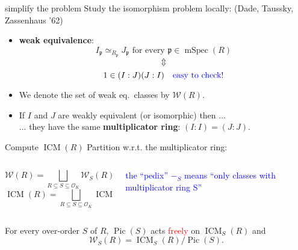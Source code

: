 \documentclass[usenames,dvipsnames,handout]{beamer}
\DeclareMathOperator{\ICM}{ICM}
\DeclareMathOperator{\Pic}{Pic}
\DeclareMathOperator{\mSpec}{mSpec}
\newcommand{\cO}{{\mathcal O}}
\newcommand{\cW}{{\mathcal W}}
\newcommand{\p}{{\mathfrak p}}
\newcommand{\red}[1]{\textcolor{red}{#1}}
\begin{document}
\begin{frame}{ simplify the problem  }
    Study the isomorphism problem locally: (Dade, Taussky, Zassenhaus '62)
    \begin{itemize}
\pause 
    \item  \textbf{weak equivalence}:
    \[I_{\p}\simeq_{R_{\p}} J_{\p} \text{ for every } {\p} \in \mSpec(R)\]
\pause
    \vspace{-6mm}\[\Updownarrow\]
    \[1\in (I:J)(J:I)\quad \textcolor{blue}{\text{easy to check!}}\]
\pause
    \item We denote the set of weak eq.~classes by $\cW(R)$.
\pause 
    \item If $I$ and $J$ are weakly equivalent (or isomorphic) then ...\\
\pause 
    ... they have the same {\bf multiplicator ring}: $(I:I)=(J:J)$.
    \end{itemize}
\end{frame}

\begin{frame}{ Compute $\ICM(R)$ }
\pause 
    Partition w.r.t. the multiplicator ring:
    \begin{columns}
    \begin{column}{0.5\textwidth}
      \[ \cW(R) = \bigsqcup_{R\subseteq S \subseteq \cO_K} \cW_S(R)\]
      \[ \ICM(R) = \bigsqcup_{R\subseteq S \subseteq \cO_K} \ICM_S(R)\]
    \end{column}
\pause
    \begin{column}{0.5\textwidth}  %
    \begin{center}
    \textcolor{blue}{\parbox{10em}{the ``pedix'' $-_S$ means ``only classes with multiplicator ring S''}} 
    \end{center}
    \end{column}
    \end{columns}
\pause \vspace{2em}
    \begin{theorem}[M.]
    For every over-order $S$ of $R$, $\Pic(S)$ acts \red{freely} on $\ICM_S(R)$ and
    \[ \cW_S(R) = \ICM_S(R) / \Pic(S). \]
    \end{theorem}
\end{frame}
\end{document}
